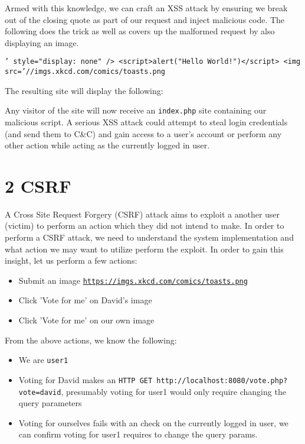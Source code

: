 \documentclass[a4paper, 12pt]{article}
\begin{document}
Armed with this knowledge, we can craft an XSS attack by ensuring we break out of the closing quote as part of our request and inject malicious code. The following does the trick as well as covers up the malformed request by also displaying an image.

\texttt{\linebreak' style="display: none" />
\linebreak<script>alert("Hello World!")</script>
\linebreak<img src='//imgs.xkcd.com/comics/toasts.png
}
\linebreak

The resulting site will display the following:



Any visitor of the site will now receive an \texttt{index.php} site containing our malicious script. A serious XSS attack could attempt to steal login credentials (and send them to C\&C) and gain access to a user's account or perform any other action while acting as the currently logged in user.

\section*{2 CSRF}
A Cross Site Request Forgery (CSRF) attack aims to exploit a another user (victim) to perform an action which they did not intend to make. In order to perform a CSRF attack, we need to understand the system implementation and what action we may want to utilize perform the exploit. In order to gain this insight, let us perform a few actions:

\begin{itemize}
	\item Submit an image \texttt{\url{https://imgs.xkcd.com/comics/toasts.png}}
    \item Click 'Vote for me' on David's image
    \item Click 'Vote for me' on our own image
\end{itemize}

From the above actions, we know the following:
\begin{itemize}
	\item We are \texttt{user1}
	\item Voting for David makes an \texttt{HTTP GET http://localhost:8080/vote.php?vote=david}, presumably voting for user1 would only require changing the query parameters
    \item Voting for ourselves fails with an check on the currently logged in user, we can confirm voting for user1 requires to change the query params.
\end{itemize}
\end{document}
